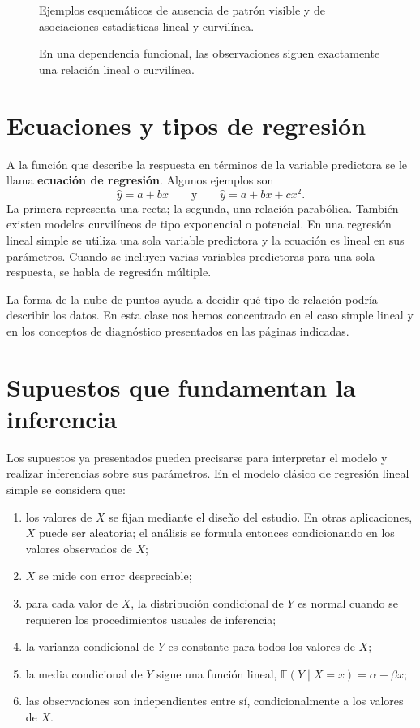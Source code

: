 \begin{figure}[H]
\centering

\caption{Ejemplos esquemáticos de ausencia de patrón visible y de asociaciones estadísticas lineal y curvilínea.}
\label{fig:dependencia-estadistica}
\end{figure}

\begin{figure}[H]
\centering

\caption{En una dependencia funcional, las observaciones siguen exactamente una relación lineal o curvilínea.}
\label{fig:dependencia-funcional}
\end{figure}

\section{Ecuaciones y tipos de regresión}

A la función que describe la respuesta en términos de la variable predictora se le llama \textbf{ecuación de regresión}. Algunos ejemplos son
\[
\widehat{y}=a+bx
\qquad\text{y}\qquad
\widehat{y}=a+bx+cx^2.
\]
La primera representa una recta; la segunda, una relación parabólica. También existen modelos curvilíneos de tipo exponencial o potencial. En una regresión lineal simple se utiliza una sola variable predictora y la ecuación es lineal en sus parámetros. Cuando se incluyen varias variables predictoras para una sola respuesta, se habla de regresión múltiple.

La forma de la nube de puntos ayuda a decidir qué tipo de relación podría describir los datos. En esta clase nos hemos concentrado en el caso simple lineal y en los conceptos de diagnóstico presentados en las páginas indicadas.


\clearpage
\section{Supuestos que fundamentan la inferencia}

Los supuestos ya presentados pueden precisarse para interpretar el modelo y realizar inferencias sobre sus parámetros. En el modelo clásico de regresión lineal simple se considera que:

\begin{enumerate}
    \item los valores de $X$ se fijan mediante el diseño del estudio. En otras aplicaciones, $X$ puede ser aleatoria; el análisis se formula entonces condicionando en los valores observados de $X$;
    \item $X$ se mide con error despreciable;
    \item para cada valor de $X$, la distribución condicional de $Y$ es normal cuando se requieren los procedimientos usuales de inferencia;
    \item la varianza condicional de $Y$ es constante para todos los valores de $X$;
    \item la media condicional de $Y$ sigue una función lineal, $\mathbb{E}(Y\mid X=x)=\alpha+\beta x$;
    \item las observaciones son independientes entre sí, condicionalmente a los valores de $X$.
\end{enumerate}

